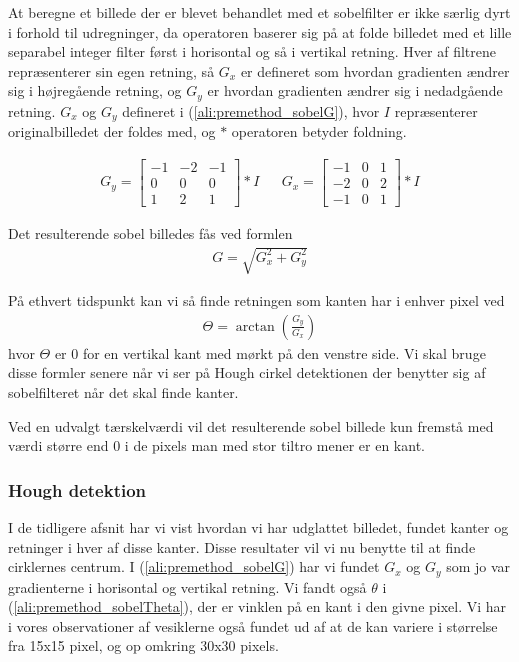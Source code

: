 At beregne et billede der er blevet behandlet med et sobelfilter er ikke særlig dyrt i forhold til udregninger, da operatoren baserer sig på at folde billedet med et lille separabel integer filter først i horisontal og så i vertikal retning. Hver af filtrene repræsenterer sin egen retning, så $G_x$ er defineret som hvordan gradienten ændrer sig i højregående retning, og $G_y$ er hvordan gradienten ændrer sig i nedadgående retning. $G_x$ og $G_y$ defineret i  (\ref{ali:premethod_sobelG}), hvor $I$ repræsenterer originalbilledet der foldes med, og $*$ operatoren betyder foldning.

\begin{align}
	G_y = \begin{bmatrix}
		-1 & -2 & -1\\
		0 & 0 & 0\\
		1 & 2 & 1
	\end{bmatrix} * I
	&&
	G_x = \begin{bmatrix}
		-1 & 0 & 1\\
		-2 & 0 & 2\\
		-1 & 0 & 1
	\end{bmatrix} * I
	\label{ali:premethod_sobelG}
\end{align} 

Det resulterende sobel billedes fås ved formlen 
\begin{align}
	G = \sqrt{G_x^2 + G_y^2}
\end{align}

På ethvert tidspunkt kan vi så finde retningen som kanten har i enhver pixel ved 
\begin{align}
	\Theta = \arctan\left(\frac{G_y}{G_x}\right)
	\label{ali:premethod_sobelTheta}
\end{align}
hvor $\Theta$ er 0 for en vertikal kant med mørkt på den venstre side. Vi skal bruge disse formler senere når vi ser på Hough cirkel detektionen der benytter sig af sobelfilteret når det skal finde kanter. 


Ved en udvalgt tærskelværdi vil det resulterende sobel billede kun fremstå med værdi større end 0 i de pixels man med stor tiltro mener er en kant. 


\subsubsection{Hough detektion}\label{premethod_hough}
I de tidligere afsnit har vi vist hvordan vi har udglattet billedet, fundet kanter og retninger i hver af disse kanter. Disse resultater vil vi nu benytte til at finde cirklernes centrum. I (\ref{ali:premethod_sobelG}) har vi fundet $G_x$ og $G_y$ som jo var gradienterne i horisontal og vertikal retning. Vi fandt også $\theta$ i (\ref{ali:premethod_sobelTheta}), der er vinklen på en kant i den givne pixel. Vi har i vores observationer af vesiklerne også fundet ud af at de kan variere i størrelse fra 15x15 pixel, og op omkring 30x30 pixels.

